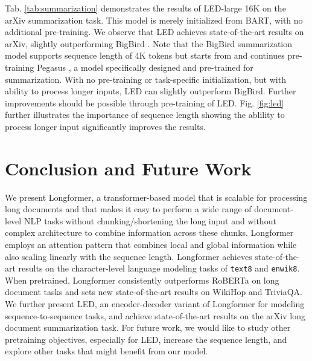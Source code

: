 \documentclass[11pt,a4paper]{article}
\newcommand{\model}{Longformer\xspace}
\begin{document}
Tab. \ref{tab:summarization} demonstrates the results of LED-large 16K on the arXiv summarization task. This model is merely initialized from BART, with no additional pre-training. We observe that LED achieves state-of-the-art results on arXiv, slightly outperforming BigBird \cite{Zaheer2020BigBT}.
Note that the BigBird summarization model supports sequence length of 4K tokens but starts from and continues pre-training Pegasus \cite{zhang2019pegasus}, a model specifically designed and pre-trained for summarization.
With no pre-training or task-specific initialization, but with ability to process longer inputs, LED can slightly outperform BigBird. Further improvements should be possible through pre-training of LED.
Fig. \ref{fig:led} further illustrates the importance of sequence length showing the ablility to process longer input significantly improves the results. 

 













 

\section{Conclusion and Future Work}
We present \model, a transformer-based model that is scalable for processing long documents and that makes it easy to perform a wide 
range of document-level NLP tasks without chunking/shortening the long input and without complex architecture to combine information across these chunks. 
\model employs an attention pattern that combines local and global
information while also scaling linearly with the sequence length.
\model achieves state-of-the-art results on the character-level
language modeling tasks of \texttt{text8} and \texttt{enwik8}. 
When pretrained, 
\model consistently outperforms RoBERTa on long document tasks and
sets new state-of-the-art results on WikiHop and TriviaQA. 
We further present LED, an encoder-decoder variant of Longformer for modeling sequence-to-sequence tasks, and achieve state-of-the-art results on the arXiv long document summarization task. 
For future work, we would like to study other pretraining objectives, especially for LED, increase the sequence length, and explore other tasks that might benefit from our model. 
\end{document}

